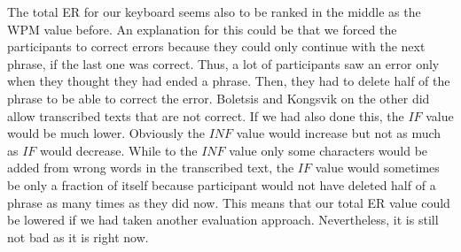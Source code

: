 The total ER for our keyboard seems also to be ranked in the middle as the WPM value before. An explanation for this could be that we forced the participants to correct errors because they could only continue with the next phrase, if the last one was correct. Thus, a lot of participants saw an error only when they thought they had ended a phrase. Then, they had to delete half of the phrase to be able to correct the error. Boletsis and Kongsvik \cite{Boletsis2019ControllerbasedTT} on the other did allow transcribed texts that are not correct. If we had also done this, the $IF$ value would be much lower. Obviously the $INF$ value would increase but not as much as $IF$ would decrease. While to the $INF$ value only some characters would be added from wrong words in the transcribed text, the $IF$ value would sometimes be only a fraction of itself because participant would not have deleted half of a phrase as many times as they did now. This means that our total ER value could be lowered if we had taken another evaluation approach. Nevertheless, it is still not bad as it is right now.

